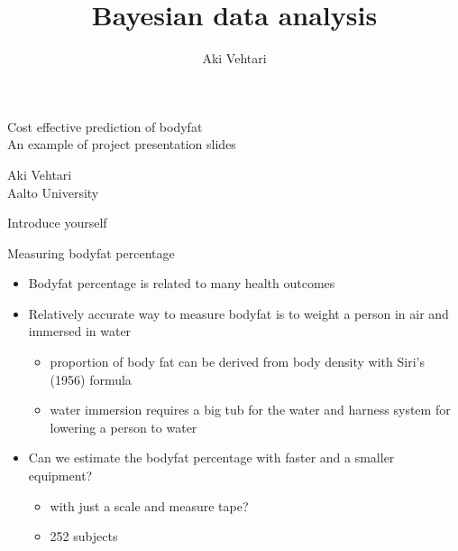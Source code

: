 \documentclass[english,t]{beamer}
\title[]{Bayesian data analysis}
\subtitle{}
\author[Aki.Vehtari@aalto.fi -- @avehtari]{Aki Vehtari}
\institute[Aalto]{}
\date[]{}
\begin{document}
\begin{frame}

  \centering

  \baselineskip

  \LARGE{\color{navyblue} Cost effective prediction of bodyfat}\\
      \large{\color{gray} An example of project presentation slides}


    \baselineskip

    \Large{Aki Vehtari}\\
    \large{Aalto University}

    \baselineskip

    \pause
    Introduce yourself

  
\end{frame}

\begin{frame}
  
  {\Large\color{navyblue} Measuring bodyfat percentage}


  \begin{itemize}
  \item Bodyfat percentage is related to many health outcomes
  \item<2-> Relatively accurate way to measure bodyfat is to weight a
    person in air and immersed in water
    \begin{itemize}
    \item proportion of body fat can be derived from body density with
      Siri's (1956) formula
    \item water immersion requires a big tub for the water and harness
      system for lowering a person to water
    \end{itemize}
  \item<3-> Can we estimate the bodyfat percentage with faster and a
    smaller equipment?
    \begin{itemize}
    \item with just a scale and measure tape?
    \item 252 subjects
    \end{itemize}
  \end{itemize}
  \vspace{2\baselineskip}
  
\end{frame}
\end{document}
